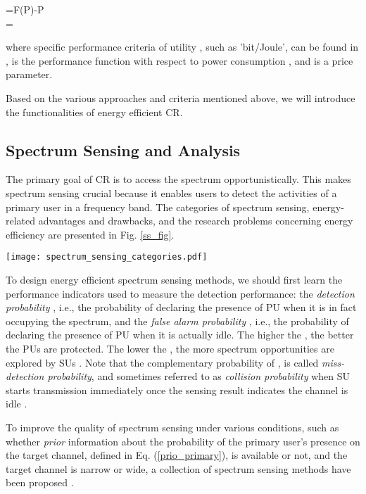 \documentclass[journal,12pt,onecolumn]{IEEEtran}
\begin{document}
{{\eta}=F(P)-{\mu}P} \\
{{\eta}=}

where specific performance criteria of utility , such as 'bit/Joule', can be found in \cite{DeDomenico20145},  is the performance function with respect to power consumption , and  is a price parameter. 

Based on the various approaches and criteria mentioned above, we will introduce the functionalities of energy efficient CR.

\subsection{Spectrum Sensing and Analysis}
The primary goal of CR is to access the spectrum opportunistically. This makes spectrum sensing crucial because it enables users to detect the activities of a primary user in a frequency band. The categories of spectrum sensing, energy-related advantages and drawbacks, and the research problems concerning energy efficiency are presented in Fig. \ref{ss_fig}.


\begin{figure*}
\texttt{[image: spectrum\_sensing\_categories.pdf]}
\caption{Categories of spectrum sensing.}
\label{ss_fig}
\end{figure*}

To design energy efficient spectrum sensing methods, we should first learn the performance indicators used to measure the detection performance: the \emph{detection probability} , i.e., the probability of declaring the presence of PU when it is in fact occupying the spectrum, and the \emph{false alarm probability} , i.e., the probability of declaring the presence of PU when it is actually idle. The higher the , the better the PUs are protected. The lower the , the more spectrum opportunities are explored by SUs \cite{ssCriteria}. Note that the complementary probability of , is called \emph{miss-detection probability}, and sometimes referred to as \emph{collision probability} when SU starts transmission immediately once the sensing result indicates the channel is idle \cite{threestrategies}.

To improve the quality of spectrum sensing under various conditions, such as whether \emph{prior} information about the probability of the primary user's presence on the target channel, defined in Eq. (\ref{prio_primary}), is available or not, and the target channel is narrow or wide, a collection of spectrum sensing methods have been proposed \cite{SSsingleDualRadio}.
\end{document}
